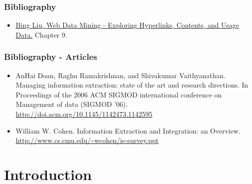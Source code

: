 \documentclass{beamer}
\subtitle{Information Extraction : An Introduction}
\begin{document}
\maketitle


\begin{frame}
    \frametitle{Bibliography}
    \begin{block}{}
        \begin{itemize}
        \item \href{https://www.cs.uic.edu/~liub/WebMiningBook.html}{Bing Liu, Web Data Mining - Exploring Hyperlinks, Contents, and Usage Data.} Chapter 9.

        \end{itemize}
    \end{block}
\end{frame}
\begin{frame}
    \frametitle{Bibliography - Articles}
    \begin{block}{}
        \begin{itemize}
        \item AnHai Doan, Raghu Ramakrishnan, and Shivakumar
            Vaithyanathan. Managing information extraction: state of the art
            and research directions. In Proceedings of the 2006 ACM SIGMOD
            international conference on Management of data (SIGMOD '06).
            \url{http://doi.acm.org/10.1145/1142473.1142595}
        \item William W. Cohen. Information Extraction and Integration: an
            Overview. \url{http://www.cs.cmu.edu/~wcohen/ie-survey.ppt}
        \end{itemize}
    \end{block}
\end{frame}

\section{Introduction}
\end{document}
